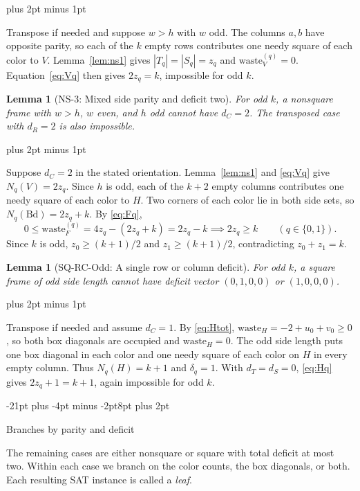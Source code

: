 \documentclass[11pt,a4paper]{article}
\makeatletter
\renewcommand{\section}{\@startsection{section}{1}{\z@}%
  {-21pt plus -4pt minus -2pt}{8pt plus 2pt}%
  {\normalfont\fontsize{14}{17}\selectfont\bfseries\raggedright}}
\renewenvironment{proof}[1][\proofname]{%
  \par\pushQED{\qed}\normalfont
  \topsep8pt plus 2pt minus 1pt\relax
  \trivlist\item[\hskip\labelsep\itshape #1\@addpunct{.}]\ignorespaces
}{\popQED\endtrivlist\@endpefalse}
\theoremstyle{result}
\newtheorem{lemma}[theorem]{Lemma}
\theoremstyle{definition}
\theoremstyle{remark}
\newcommand{\waste}{\mathrm{waste}}
\newcommand{\Bd}{\mathrm{Bd}}
\makeatother
\begin{document}
\begin{proof}
Transpose if needed and suppose $w>h$ with $w$ odd. The columns
$a,b$ have opposite parity, so each of the $k$ empty rows
contributes one needy square of each color to $V$.
Lemma~\ref{lem:ns1} gives $|T_q|=|S_q|=z_q$ and
$\waste_V^{(q)}=0$. Equation~\eqref{eq:Vq} then gives
$2z_q=k$, impossible for odd $k$.
\end{proof}

\begin{lemma}[NS-3: Mixed side parity and deficit two]\label{lem:ns3}
For odd $k$, a nonsquare frame with $w>h$, $w$ even, and $h$ odd
cannot have $d_C=2$. The transposed case with $d_R=2$ is also impossible.
\end{lemma}

\begin{proof}
Suppose $d_C=2$ in the stated orientation.
Lemma~\ref{lem:ns1} and \eqref{eq:Vq} give $N_q(V)=2z_q$.
Since $h$ is odd, each of the $k+2$ empty columns contributes
one needy square of each color to $H$. Two corners of each color
lie in both side sets, so $N_q(\Bd)=2z_q+k$. By \eqref{eq:Fq},
\[
  0 \le \waste_F^{(q)} = 4 z_q - (2 z_q + k) = 2 z_q - k \implies 2 z_q \ge k \qquad (q \in \{0,1\}).
\]
Since $k$ is odd, $z_0 \ge (k+1)/2$ and $z_1 \ge (k+1)/2$, contradicting $z_0 + z_1 = k$.
\end{proof}

\begin{lemma}[SQ-RC-Odd: A single row or column deficit]\label{lem:sqrc}
For odd $k$, a square frame of odd side length cannot have
deficit vector $(0,1,0,0)$ or $(1,0,0,0)$.
\end{lemma}

\begin{proof}
Transpose if needed and assume $d_C=1$. By \eqref{eq:Htot},
$\waste_H=-2+u_0+v_0\ge0$, so both box diagonals are occupied and
$\waste_H=0$. The odd side length puts one box diagonal in each
color and one needy square of each color on $H$ in every empty
column. Thus $N_q(H)=k+1$ and $\delta_q=1$. With $d_T=d_S=0$,
\eqref{eq:Hq} gives $2z_q+1=k+1$, again impossible for odd $k$.
\end{proof}

\section{Branches by parity and deficit}\label{sec:branches}

The remaining cases are either nonsquare or square with total
deficit at most two. Within each case we branch on the color
counts, the box diagonals, or both. Each resulting SAT instance
is called a \emph{leaf}.
\end{document}
